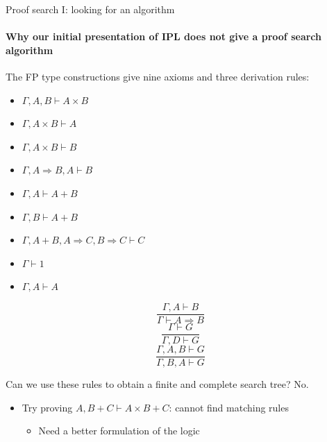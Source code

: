 \documentclass[english]{beamer}
\begin{document}
\begin{frame}{Proof search I: looking for an algorithm}


\framesubtitle{Why our initial presentation of IPL does not give a proof search
algorithm}

The FP type constructions give nine axioms and three derivation rules:

\begin{minipage}[t]{0.49\columnwidth}%
\begin{itemize}
\item $\Gamma,A,B\vdash A\times B$ 
\item $\Gamma,A\times B\vdash A$ 
\item $\Gamma,A\times B\vdash B$
\item $\Gamma,A\Rightarrow B,A\vdash B$
\item $\Gamma,A\vdash A+B$ 
\item $\Gamma,B\vdash A+B$
\item $\Gamma,A+B,A\Rightarrow C,B\Rightarrow C\vdash C$
\item $\Gamma\vdash1$
\item $\Gamma,A\vdash A$
\end{itemize}
%
\end{minipage}%
\begin{minipage}[t]{0.49\columnwidth}%
\[
\frac{\Gamma,A\vdash B}{\Gamma\vdash A\Rightarrow B}
\]
\[
\frac{\Gamma\vdash G}{\Gamma,D\vdash G}
\]
\[
\frac{\Gamma,A,B\vdash G}{\Gamma,B,A\vdash G}
\]
%
\end{minipage}

\medskip{}
Can we use these rules to obtain a finite and complete search tree?
No.
\begin{itemize}
\item Try proving $A,B+C\vdash A\times B+C$: cannot find matching rules
\begin{itemize}
\item Need a better formulation of the logic
\end{itemize}
\end{itemize}
\end{frame}
\end{document}
